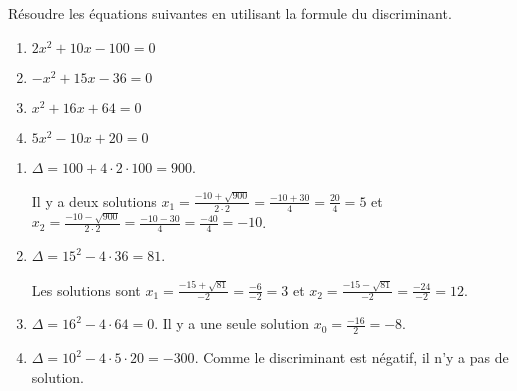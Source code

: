 


%

\begin{exo}[type=solution]
Résoudre les équations suivantes en utilisant la formule du discriminant.

\vspace{-2mm}
\begin{multicols}{2}
\begin{enumerate}[label=\bf{\alph*})\,]

\item $2x^2+10x-100=0$

\item $-x^2+15x-36=0$

\item $x^2+16x+64=0$

\item $5x^2-10x+20=0$
\end{enumerate}
\end{multicols}

\begin{sol}
\begin{enumerate}[label=\bf{\alph*})\,]
\item $\Delta=100+4\cdot2\cdot100=900$. 

Il y a deux solutions $x_1=\frac{-10+\sqrt{900}}{2\cdot 2} = \frac{-10+30}{4} = \frac{20}{4} = 5$ et
$x_2=\frac{-10-\sqrt{900}}{2\cdot 2} = \frac{-10-30}{4} = \frac{-40}{4} = -10$.


\item $\Delta = 15^2-4 \cdot 36 =81$.

Les solutions sont $x_1= \frac{-15+\sqrt{81}}{-2} = \frac{-6}{-2} = 3$ et $x_2 =\frac{-15-\sqrt{81}}{-2}= \frac{-24}{-2}=12$. 


\item $\Delta = 16^2-4\cdot 64 = 0$. Il y a une seule solution $x_0=\frac{-16}{2} = -8$.


\item $\Delta = 10^2-4\cdot 5 \cdot 20 = -300$. Comme le discriminant est négatif, il n'y a pas de solution.

\end{enumerate}	
\end{sol}	

\end{exo}



